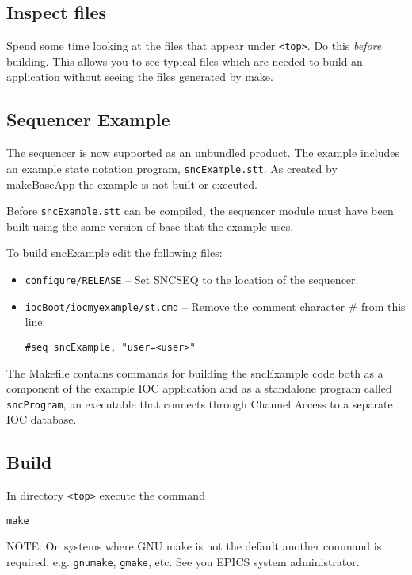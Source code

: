 \subsection{Inspect files}

Spend some time looking at the files that appear under \verb|<top>|. Do this \emph{before} building. This allows you to see typical 
files which are needed to build an application without seeing the files generated by make.

\subsection{Sequencer Example}

The sequencer is now supported as an unbundled product. The example includes an example state notation program,
\verb|sncExample.stt|. As created by makeBaseApp the example is not built or executed.

Before \verb|sncExample.stt| can be compiled, the sequencer module must have been built using the same version of base that the example uses.

To build sncExample edit the following files:

\begin{itemize}
\item \verb|configure/RELEASE| -- Set SNCSEQ to the location of the sequencer.
\item \verb|iocBoot/iocmyexample/st.cmd| -- Remove the comment character \# from this line:

\verb|#seq sncExample, "user=<user>"|
\end{itemize}

The Makefile contains commands for building the sncExample code both as a component of the example IOC application
and as a standalone program called \verb|sncProgram|, an executable that connects through Channel Access to a separate IOC database.

\subsection{Build}

In directory \verb|<top>| execute the command

\begin{verbatim}
make
\end{verbatim}

NOTE: On systems where GNU make is not the default another command is required, e.g. \verb|gnumake|, \verb|gmake|, etc. See 
you EPICS system administrator.

